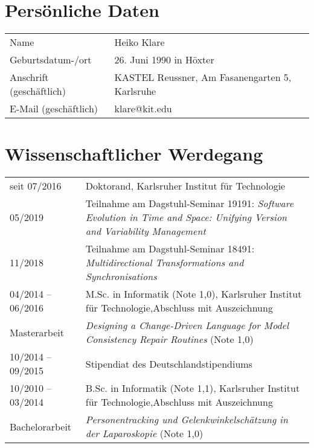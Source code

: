 \renewcommand{\arraystretch}{1.3}

\section*{Persönliche Daten}
\begin{tabular}{@{}p{4.5cm} p{8cm}}
Name & Heiko Klare \\
Geburtsdatum-/ort & 26. Juni 1990 in Höxter \\
Anschrift (geschäftlich) & KASTEL Reussner, \newline Am Fasanengarten 5, \newline 76131 Karlsruhe\\
E-Mail (geschäftlich) & klare@kit.edu
\end{tabular}

\section*{Wissenschaftlicher Werdegang}
\begin{tabular}{@{}p{3.5cm} p{10.6cm}}
seit 07/2016 & Doktorand, Karlsruher Institut für Technologie\\

05/2019 & Teilnahme am Dagstuhl-Seminar 19191: \emph{Software Evolution in Time and Space: Unifying Version and Variability Management}\\

11/2018 & Teilnahme am Dagstuhl-Seminar 18491: \emph{Multidirectional Transformations and Synchronisations}\\

04/2014 -- 06/2016 & M.Sc. in Informatik (Note 1,0), \newline Karlsruher Institut für Technologie,\newline Abschluss mit Auszeichnung\\

Masterarbeit & \emph{Designing a Change-Driven Language for Model Consistency Repair Routines} (Note 1,0)\\

10/2014 -- 09/2015 & Stipendiat des Deutschlandstipendiums \\

10/2010 -- 03/2014 & B.Sc. in Informatik (Note 1,1), \newline Karlsruher Institut für Technologie,\newline Abschluss mit Auszeichnung\\

Bachelorarbeit & \emph{Personentracking und Gelenkwinkelschätzung in der Laparoskopie} (Note 1,0)\\
\end{tabular}

